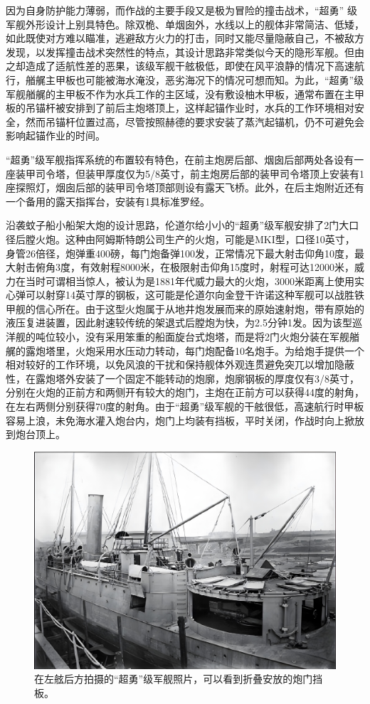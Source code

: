 \documentclass[12pt,UTF8]{ctexbook}
\begin{document}
因为自身防护能力薄弱，而作战的主要手段又是极为冒险的撞击战术，“超勇”
级军舰外形设计上别具特色。除双桅、单烟囱外，水线以上的舰体非常简洁、低矮，如此既使对方难以瞄准，逃避敌方火力的打击，同时又能尽量隐蔽自己，不被敌方发现，以发挥撞击战术突然性的特点，其设计思路非常类似今天的隐形军舰。但由之却造成了适航性差的恶果，该级军舰干舷极低，即使在风平浪静的情况下高速航行，艏艉主甲板也可能被海水淹没，恶劣海况下的情况可想而知。为此，“超勇”级军舰艏艉的主甲板不作为水兵工作的主区域，没有敷设柚木甲板，通常布置在主甲板的吊锚杆被安排到了前后主炮塔顶上，这样起锚作业时，水兵的工作环境相对安全，然而吊锚杆位置过高，尽管按照赫德的要求安装了蒸汽起锚机，仍不可避免会影响起锚作业的时间。

“超勇”级军舰指挥系统的布置较有特色，在前主炮房后部、烟囱后部两处各设有一座装甲司令塔，但装甲厚度仅为5/8英寸，前主炮房后部的装甲司令塔顶上安装有1座探照灯，烟囱后部的装甲司令塔顶部则设有露天飞桥。此外，在后主炮附近还有一个备用的露天指挥台，安装有1具标准罗经。

沿袭蚊子船小船架大炮的设计思路，伦道尔给小小的“超勇”级军舰安排了2门大口径后膛火炮。这种由阿姆斯特朗公司生产的火炮，可能是MKI型，口径10英寸，身管26倍径，炮弹重400磅，每门炮备弹100发，正常情况下最大射击仰角10度，最大射击俯角3度，有效射程8000米，在极限射击仰角15度时，射程可达12000米，威力在当时可谓相当惊人，被认为是1881年代威力最大的火炮，3000米距离上使用实心弹可以射穿14英寸厚的钢板，这可能是伦道尔向金登干许诺这种军舰可以战胜铁甲舰的信心所在。由于这型火炮属于从地井炮发展而来的原始速射炮，带有原始的液压复进装置，因此射速较传统的架退式后膛炮为快，为2.5分钟1发。因为该型巡洋舰的吨位较小，没有采用笨重的船面旋台式炮塔，而是将2门火炮分装在军舰艏艉的露炮塔里，火炮采用水压动力转动，每门炮配备10名炮手。为给炮手提供一个相对较好的工作环境，以免风浪的干扰和保持舰体外观连贯避免突兀以增加隐蔽性，在露炮塔外安装了一个固定不能转动的炮廓，炮廓钢板的厚度仅有3/8英寸，分别在火炮的正前方和两侧开有较大的炮门，主炮在正前方可以获得44度的射角，在左右两侧分别获得70度的射角。由于“超勇”级军舰的干舷很低，高速航行时甲板容易上浪，未免海水灌入炮台内，炮门上均装有挡板，平时关闭，作战时向上掀放到炮台顶上。

\begin{figure}[htbp]
	\centering
	\includegraphics[width=1\linewidth]{Images/26}
	\caption{在左舷后方拍摄的“超勇”级军舰照片，可以看到折叠安放的炮门挡板。}
	\label{fig:1}
\end{figure}
\end{document}
